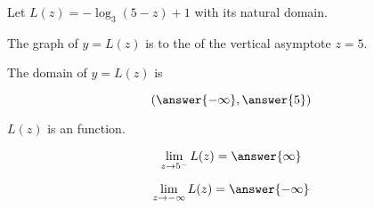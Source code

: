 \documentclass{ximera}
\author{Lee Wayand}
\begin{document}
\begin{exercise}






Let $L(z) = -\log_3(5-z) + 1$ with its natural domain. \\





\begin{question}


The graph of $y = L(z)$ is to the  of the vertical asymptote $z = 5$.


\end{question}





\begin{question}


The domain of $y = L(z)$ is 

\[
\left( \answer{-\infty}, \answer{5} \right)
\]


\end{question}






\begin{question}


$L(z)$ is an  function.


\end{question}











\begin{question}


\[
\lim\limits_{z \to 5^-} L(z) = \answer{\infty}
\]


\end{question}








\begin{question}


\[
\lim\limits_{z \to -\infty} L(z) = \answer{-\infty}
\]


\end{question}










\end{exercise}
\end{document}
